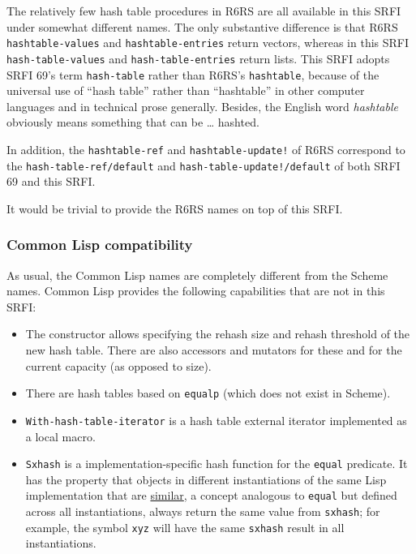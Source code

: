 The relatively few hash table procedures in R6RS are all available in
this SRFI under somewhat different names. The only substantive
difference is that R6RS \texttt{hashtable-values} and
\texttt{hashtable-entries} return vectors, whereas in this SRFI
\texttt{hash-table-values} and \texttt{hash-table-entries} return lists.
This SRFI adopts SRFI 69's term \texttt{hash-table} rather than R6RS's
\texttt{hashtable}, because of the universal use of ``hash table''
rather than ``hashtable'' in other computer languages and in technical
prose generally. Besides, the English word \emph{hashtable} obviously
means something that can be \ldots{} hashted.

In addition, the \texttt{hashtable-ref} and \texttt{hashtable-update!}
of R6RS correspond to the \texttt{hash-table-ref/default} and
\texttt{hash-table-update!/default} of both SRFI 69 and this SRFI.

It would be trivial to provide the R6RS names on top of this SRFI.

\subsubsection{Common Lisp compatibility}\label{CommonLispcompatibility}

As usual, the Common Lisp names are completely different from the Scheme
names. Common Lisp provides the following capabilities that are not in
this SRFI:

\begin{itemize}
\tightlist
\item
  The constructor allows specifying the rehash size and rehash threshold
  of the new hash table. There are also accessors and mutators for these
  and for the current capacity (as opposed to size).
\end{itemize}

\begin{itemize}
\tightlist
\item
  There are hash tables based on \texttt{equalp} (which does not exist
  in Scheme).
\end{itemize}

\begin{itemize}
\tightlist
\item
  \texttt{With-hash-table-iterator} is a hash table external iterator
  implemented as a local macro.
\end{itemize}

\begin{itemize}
\tightlist
\item
  \texttt{Sxhash} is a implementation-specific hash function for the
  \texttt{equal} predicate. It has the property that objects in
  different instantiations of the same Lisp implementation that are
  \href{http://www.lispworks.com/documentation/lw61/CLHS/Body/03_bdbb.htm}{similar},
  a concept analogous to \texttt{equal} but defined across all
  instantiations, always return the same value from \texttt{sxhash}; for
  example, the symbol \texttt{xyz} will have the same \texttt{sxhash}
  result in all instantiations.
\end{itemize}

